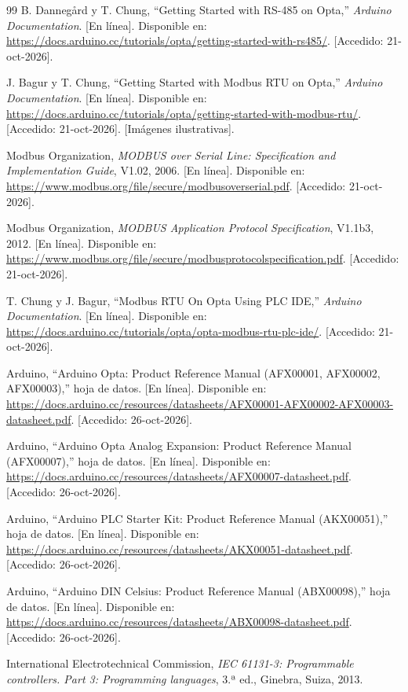 \documentclass[12pt,a4paper,oneside]{report}
\begin{document}
\begin{thebibliography}{99}
B. Dannegård y T. Chung, ``Getting Started with RS-485 on Opta,'' \emph{Arduino Documentation}. [En línea]. Disponible en: \url{https://docs.arduino.cc/tutorials/opta/getting-started-with-rs485/}. [Accedido: 21-oct-2026].

J. Bagur y T. Chung, ``Getting Started with Modbus RTU on Opta,'' \emph{Arduino Documentation}. [En línea]. Disponible en: \url{https://docs.arduino.cc/tutorials/opta/getting-started-with-modbus-rtu/}. [Accedido: 21-oct-2026]. [Imágenes ilustrativas].

Modbus Organization, \emph{MODBUS over Serial Line: Specification and Implementation Guide}, V1.02, 2006. [En línea]. Disponible en: \url{https://www.modbus.org/file/secure/modbusoverserial.pdf}. [Accedido: 21-oct-2026].

Modbus Organization, \emph{MODBUS Application Protocol Specification}, V1.1b3, 2012. [En línea]. Disponible en: \url{https://www.modbus.org/file/secure/modbusprotocolspecification.pdf}. [Accedido: 21-oct-2026].

T. Chung y J. Bagur, ``Modbus RTU On Opta Using PLC IDE,'' \emph{Arduino Documentation}. [En línea]. Disponible en: \url{https://docs.arduino.cc/tutorials/opta/opta-modbus-rtu-plc-ide/}. [Accedido: 21-oct-2026].

Arduino, ``Arduino Opta: Product Reference Manual (AFX00001, AFX00002, AFX00003),'' hoja de datos. [En línea]. Disponible en: \url{https://docs.arduino.cc/resources/datasheets/AFX00001-AFX00002-AFX00003-datasheet.pdf}. [Accedido: 26-oct-2026].

Arduino, ``Arduino Opta Analog Expansion: Product Reference Manual (AFX00007),'' hoja de datos. [En línea]. Disponible en: \url{https://docs.arduino.cc/resources/datasheets/AFX00007-datasheet.pdf}. [Accedido: 26-oct-2026].

Arduino, ``Arduino PLC Starter Kit: Product Reference Manual (AKX00051),'' hoja de datos. [En línea]. Disponible en: \url{https://docs.arduino.cc/resources/datasheets/AKX00051-datasheet.pdf}. [Accedido: 26-oct-2026].

Arduino, ``Arduino DIN Celsius: Product Reference Manual (ABX00098),'' hoja de datos. [En línea]. Disponible en: \url{https://docs.arduino.cc/resources/datasheets/ABX00098-datasheet.pdf}. [Accedido: 26-oct-2026].

International Electrotechnical Commission, \emph{IEC 61131-3: Programmable controllers. Part 3: Programming languages}, 3.ª ed., Ginebra, Suiza, 2013.


\end{thebibliography}
\end{document}

